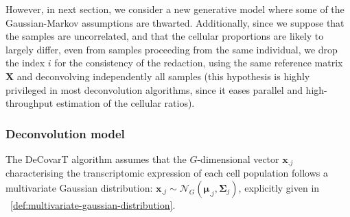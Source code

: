 \documentclass[long, final]{jobim}
\begin{document}
However, in next section, we consider a new generative model where some of the Gaussian-Markov assumptions are thwarted. Additionally, since we suppose that the samples are uncorrelated, and that the cellular proportions are likely to largely differ, even from samples proceeding from the same individual, we drop the index $i$ for the consistency of the redaction, using the same reference matrix $\boldsymbol{X}$ and deconvolving independently all samples (this hypothesis is highly privileged in most deconvolution algorithms, since it eases parallel and high-throughput estimation of the cellular ratios).


\subsubsection{Deconvolution model}
\label{subsubsec:deconvolution-model}

The DeCovarT algorithm assumes that the $G$-dimensional vector $\boldsymbol{x}_{.j}$ characterising the transcriptomic expression of each cell population follows a multivariate Gaussian distribution: $\boldsymbol{x}_{.j} \sim \mathcal{N}_G(\boldsymbol{\mu}_{.j}, \boldsymbol{\boldsymbol{\Sigma}}_{j})$, explicitly given in ~\ref{def:multivariate-gaussian-distribution}.
\end{document}
